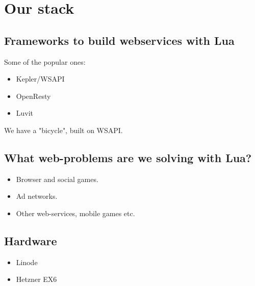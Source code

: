 \documentclass[aspectratio=169,handout,bigger]{beamer}
\begin{document}

\section{Our stack}


\subsection*{Frameworks to build webservices with Lua}

\begin{frame}
  Some of the popular ones:
  \begin{itemize}
    \item Kepler/WSAPI
    \item OpenResty
    \item Luvit
  \end{itemize}

  We have a "bicycle", built on WSAPI.
\end{frame}


\subsection*{What web-problems are we solving with Lua?}

\begin{frame}
  \begin{itemize}
    \item Browser and social games.
    \item Ad networks.
    \item Other web-services, mobile games etc.
  \end{itemize}
\end{frame}


\subsection*{Hardware}

\begin{frame}
  \begin{itemize}
    \item Linode
    \item Hetzner EX6
  \end{itemize}
\end{frame}
\end{document}
